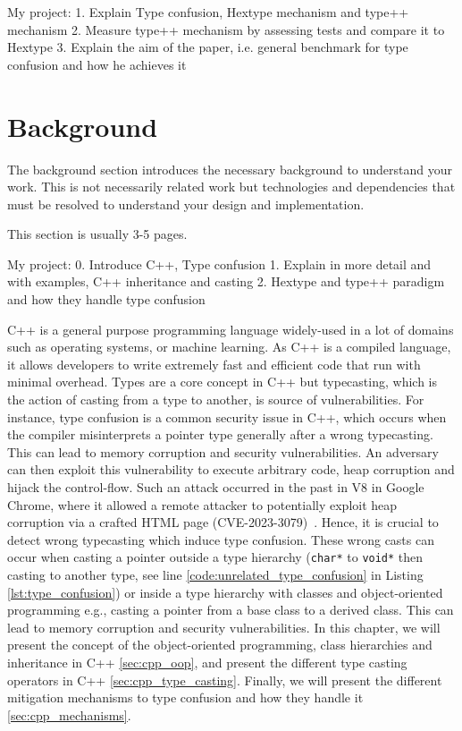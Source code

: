\documentclass[a4paper,11pt,oneside]{report}
\begin{document}
My project: 
1. Explain Type confusion, Hextype mechanism and type++ mechanism
2. Measure type++ mechanism by assessing tests and compare it to Hextype
3. Explain the aim of the paper, i.e. general benchmark for type confusion and how he achieves it

\chapter{Background}

The background section introduces the necessary background to understand your
work. This is not necessarily related work but technologies and dependencies
that must be resolved to understand your design and implementation.

This section is usually 3-5 pages.

My project:
0. Introduce C++, Type confusion
1. Explain in more detail and with examples, C++ inheritance and casting
2. Hextype and type++ paradigm and how they handle type confusion

C++ is a general purpose 
programming language widely-used in a lot of domains
such as operating systems, or machine learning. As C++ is a compiled language, it
allows developers to write extremely fast and efficient code
that run with minimal overhead. Types are a core concept in C++
but typecasting, which is the action of casting from a type to another,
is source of vulnerabilities. For instance, type confusion is a common
security issue in C++, which occurs when the compiler misinterprets a pointer
type generally after a wrong typecasting. This can lead to memory corruption
and security vulnerabilities. An adversary can then exploit this vulnerability
to execute arbitrary code, heap corruption and hijack the control-flow.  Such an
attack occurred in the past in V8 in Google Chrome, where it allowed a remote
attacker to potentially exploit heap corruption via a crafted HTML page
(CVE-2023-3079)~\cite{nist}. Hence, it is crucial to detect wrong typecasting which induce
type confusion.  These wrong casts can occur when casting a pointer outside a
type hierarchy (\texttt{char*} to \texttt{void*} then casting to another type,
see line \ref{code:unrelated_type_confusion} in Listing
\autoref{lst:type_confusion}) or inside a type hierarchy with classes and
object-oriented programming e.g., casting a pointer from a base class to a
derived class. This can lead to memory corruption and security
vulnerabilities. In this chapter, we will present the concept of the object-oriented
programming, class hierarchies and inheritance in C++ \autoref{sec:cpp_oop}, and
present the different type casting operators in C++
\autoref{sec:cpp_type_casting}.  Finally, we will present the different
mitigation mechanisms to type confusion and how they handle it \autoref{sec:cpp_mechanisms}.
\end{document}
